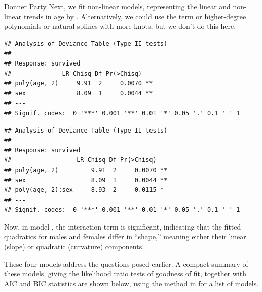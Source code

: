 \documentclass[11pt]{book}
\renewenvironment{knitrout}{\small\renewcommand{\baselinestretch}{.85}}{} %
\begin{document}
\begin{Example}[donner1]{Donner Party}
Next, we fit non-linear models, representing the linear and non-linear
trends in age by .  Alternatively, we could use
the term  or higher-degree polynomials or 
natural splines with more knots, but we don't do this here.
\begin{knitrout}
\color{fgcolor}\begin{kframe}
\begin{alltt}
 \hlkwb{<-}  \hlopt{~} \hlstd{)} \hlopt{+} 
                    
\end{alltt}
\begin{verbatim}
## Analysis of Deviance Table (Type II tests)
## 
## Response: survived
##              LR Chisq Df Pr(>Chisq)   
## poly(age, 2)     9.91  2     0.0070 **
## sex              8.09  1     0.0044 **
## ---
## Signif. codes:  0 '***' 0.001 '**' 0.01 '*' 0.05 '.' 0.1 ' ' 1
\end{verbatim}
\begin{alltt}
 \hlkwb{<-}  \hlopt{~} \hlstd{)} \hlopt{*} 
                    
\end{alltt}
\begin{verbatim}
## Analysis of Deviance Table (Type II tests)
## 
## Response: survived
##                  LR Chisq Df Pr(>Chisq)   
## poly(age, 2)         9.91  2     0.0070 **
## sex                  8.09  1     0.0044 **
## poly(age, 2):sex     8.93  2     0.0115 * 
## ---
## Signif. codes:  0 '***' 0.001 '**' 0.01 '*' 0.05 '.' 0.1 ' ' 1
\end{verbatim}
\end{kframe}
\end{knitrout}
\noindent Now, in model ,  the interaction term
 is significant, indicating that the 
fitted quadratics for males and females differ in ``shape,''
meaning either their linear (slope) or quadratic (curvature)
components.

These four models address the questions posed earlier. A compact
summary of these models, giving the likelihood ratio tests
of goodness of fit, together with AIC and BIC statistics are
shown below, using the  method in 
for a list of  models.


\end{Example}
\end{document}
